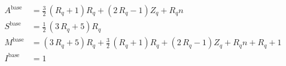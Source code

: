 \begin{align*}
A^{\mathrm{base}} &= \frac{3}{2} \, {\left(R_{q} + 1\right)} R_{q} + {\left(2 \, R_{q} - 1\right)} Z_{q} + R_{q} n \\
S^{\mathrm{base}} &= \frac{1}{2} \, {\left(3 \, R_{q} + 5\right)} R_{q} \\
M^{\mathrm{base}} &= {\left(3 \, R_{q} + 5\right)} R_{q} + \frac{3}{2} \, {\left(R_{q} + 1\right)} R_{q} + {\left(2 \, R_{q} - 1\right)} Z_{q} + R_{q} n + R_{q} + 1 \\
I^{\mathrm{base}} &= 1 
\end{align*}

